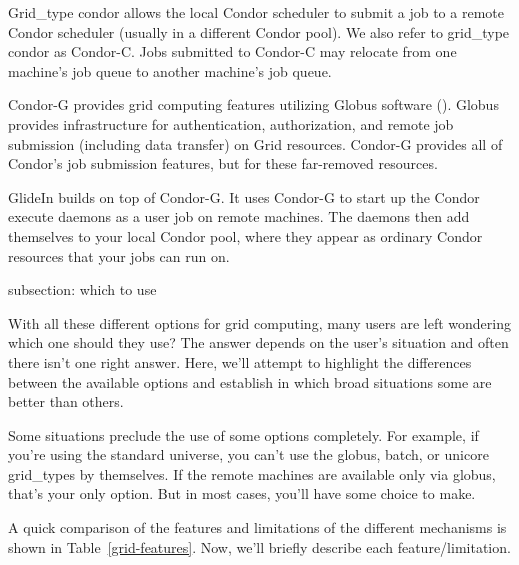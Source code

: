 Grid\_type condor allows the local Condor scheduler to submit a job to
a remote Condor scheduler (usually in a different Condor pool). We also
refer to grid\_type condor as Condor-C.
Jobs submitted to Condor-C may relocate from one machine's
job queue to another machine's job queue.

Condor-G provides
grid computing features utilizing Globus software
().
Globus provides infrastructure for authentication, authorization,
and remote job submission (including data transfer) on Grid resources.
Condor-G provides all of Condor's job submission features,
but for these far-removed resources.

GlideIn builds on top of Condor-G. It uses Condor-G to start up the Condor
execute daemons as a user job on remote machines. The daemons then add
themselves to your local Condor pool, where they appear as ordinary
Condor resources that your jobs can run on.


subsection: which to use

With all these different options for grid computing, many users are left
wondering which one should they use? The answer depends on the user's
situation and often there isn't one right answer. Here, we'll attempt to
highlight the differences between the available options and establish in
which broad situations some are better than others.

Some situations preclude the use of some options completely. For example,
if you're using the standard universe, you can't use the globus, batch, or
unicore grid\_types by themselves. If the remote machines are available
only via globus, that's your only option. But in most cases, you'll have
some choice to make.

A quick comparison of the features and limitations of the different
mechanisms is shown in Table~\ref{grid-features}. Now, we'll briefly
describe each feature/limitation.

